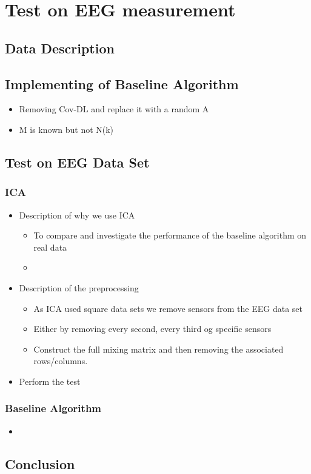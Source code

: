 \chapter{Test on EEG measurement}

\section{Data Description}

\section{Implementing of Baseline Algorithm}
\begin{itemize}
\item Removing Cov-DL and replace it with a random A
\item M is known but not N(k)
\end{itemize}

\section{Test on EEG Data Set}

\subsection{ICA}
\begin{itemize}
\item Description of why we use ICA
	\begin{itemize}
	\item To compare and investigate the performance of the baseline algorithm on real data
	\item 
	\end{itemize}
\item Description of the preprocessing
	\begin{itemize}
	\item As ICA used square data sets we remove sensors from the EEG data set
	\item Either by removing every second, every third og specific sensors
	\item Construct the full mixing matrix and then removing the associated rows/columns.
	\end{itemize}
\item Perform the test
\end{itemize}

\subsection{Baseline Algorithm}
\begin{itemize}
\item 
\end{itemize}

\section{Conclusion}
